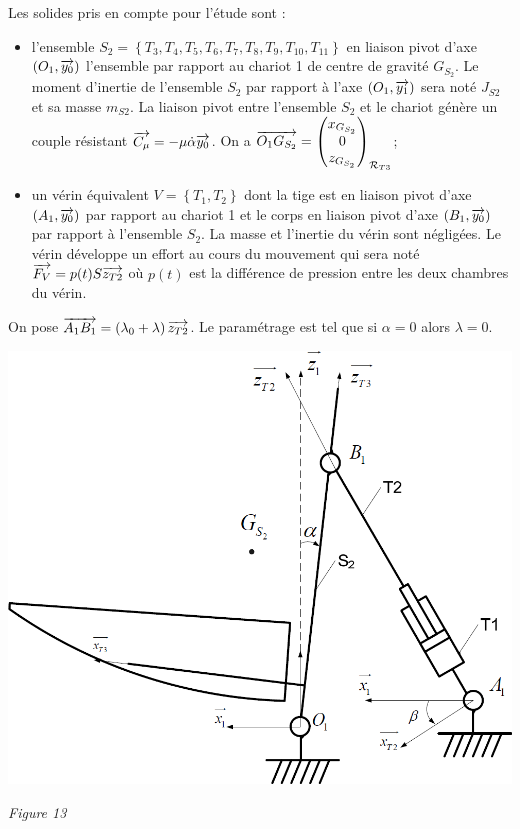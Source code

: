 \documentclass[10pt,fleqn]{article} %
\begin{document}
Les solides pris en compte pour l’étude sont :
\begin{itemize}
\item l'ensemble $S_2=\left\{ T_3, T_4, T_5, T_6, T_7, T_8, T_9, T_{10},  T_{11}\right\}$ en liaison pivot d’axe $\left(O_1,\overrightarrow{y_0}\right)$ l’ensemble par rapport au chariot 1 de centre de gravité $G_{S_2}$. Le moment d’inertie de l’ensemble $S_2$ par rapport à l’axe $\left(O_1,\overrightarrow{y_1}\right)$ sera noté $J_{S2}$ et sa masse $m_{S2}$. La liaison pivot entre l’ensemble $S_2$ et le chariot génère un couple résistant $\overrightarrow{C_{\mu}}=-\mu\dot{\alpha} \overrightarrow{y_0}$. On a $\overrightarrow{O_1G_{S_2}}=\begin{pmatrix} x_{G_{S_2}} \\ 0 \\ z_{G_{S_2}} \end{pmatrix}_{\mathcal{R}_{T3}}$;
\item un vérin équivalent $V=\left\{T_1,T_2\right\}$ dont la tige est en liaison pivot d’axe $\left(A_1,\overrightarrow{{y_0}}\right)$ par rapport au chariot 1 et le corps en liaison pivot d’axe $\left(B_1,\overrightarrow{y_0}\right)$ par rapport à l’ensemble $S_2$. La masse et l’inertie du vérin sont négligées. Le vérin développe un effort au cours du mouvement qui sera noté $\overrightarrow{F_V}=p(t)S\overrightarrow{z_{T2}}$ où $p(t)$ est la différence de pression entre les deux chambres du vérin.
\end{itemize}

On pose $\overrightarrow{A_1B_1} = \left( \lambda_0 + \lambda\right)\overrightarrow{z_{T2}}$. Le paramétrage est tel que si $\alpha=0$ alors $\lambda=0$. 


\begin{center}
\includegraphics[width=.8\linewidth]{images/fig_13}

\textit{Figure 13}
\end{center}
\end{document}
